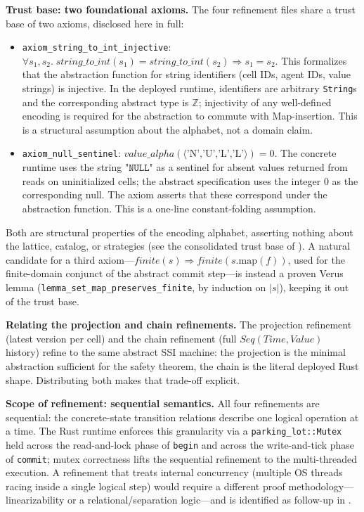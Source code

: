 \documentclass[journal,compsoc,10pt]{IEEEtran}
\theoremstyle{definition}
\theoremstyle{remark}
\newcommand{\fld}[1]{\mathit{#1}}
\begin{document}
\medskip
\noindent\textbf{Trust base: two foundational axioms.}
The four refinement files share a trust base of two axioms,
disclosed here in full:

\begin{itemize}
\item \texttt{axiom\_string\_to\_int\_injective}:
    $\forall s_1, s_2.\;
    \fld{string\_to\_int}(s_1) = \fld{string\_to\_int}(s_2) \Rightarrow s_1 = s_2$.
    This formalizes that the abstraction function for string
    identifiers (cell IDs, agent IDs, value strings) is
    injective. In the deployed runtime, identifiers are
    arbitrary \texttt{String}s and the corresponding abstract
    type is $\mathbb{Z}$; injectivity of any well-defined
    encoding is required for the abstraction to commute with
    Map-insertion. This is a structural assumption about the
    alphabet, not a domain claim.

\item \texttt{axiom\_null\_sentinel}:
    $\fld{value\_alpha}(\langle\text{'N','U','L','L'}\rangle) =
    0$. The concrete runtime uses the string $\texttt{"NULL"}$
    as a sentinel for absent values returned from reads on
    uninitialized cells; the abstract specification uses the
    integer $0$ as the corresponding null. The axiom asserts that
    these correspond under the abstraction function. This is a
    one-line constant-folding assumption.
\end{itemize}

\noindent
Both are structural properties of the encoding alphabet, asserting nothing
about the lattice, catalog, or strategies (see the consolidated trust base
of ). A natural candidate for a third
axiom---$\fld{finite}(s)\Rightarrow\fld{finite}(s.\mathrm{map}(f))$, used
for the finite-domain conjunct of the abstract commit step---is instead a
proven Verus lemma (\texttt{lemma\_set\_map\_preserves\_finite}, by
induction on $|s|$), keeping it out of the trust base.

\medskip
\noindent\textbf{Relating the projection and chain refinements.}
The projection refinement (latest version per cell) and the chain
refinement (full $\fld{Seq}(\fld{Time},\fld{Value})$ history) refine to the
same abstract SSI machine: the projection is the minimal abstraction
sufficient for the safety theorem, the chain is the literal deployed Rust
shape. Distributing both makes that trade-off explicit.

\medskip
\noindent\textbf{Scope of refinement: sequential semantics.}
All four refinements are sequential: the concrete-state transition
relations describe one logical operation at a time. The Rust
runtime enforces this granularity via a
\texttt{parking\_lot::Mutex} held across the read-and-lock phase
of \texttt{begin} and across the write-and-tick phase of
\texttt{commit}; mutex correctness lifts the sequential
refinement to the multi-threaded execution. A refinement that
treats internal concurrency (multiple OS threads racing inside
a single logical step) would require a different
proof methodology---linearizability or a relational/separation
logic---and is identified as follow-up in
.
\end{document}
